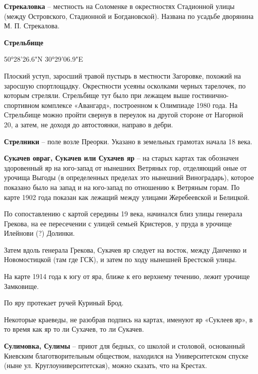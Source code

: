 \textbf{Стрекаловка} – местность на Соломенке в окрестностях Стадионной улицы (между Островского, Стадионной и Богдановской). Названа по усадьбе дворянина М. П. Стрекалова.\\

\medskip

\textbf{Стрельбище}

50°28'26.6"N 30°29'06.9"E

Плоский уступ, заросший травой пустырь в местности Загоровке, похожий на заросшую спортлощадку. Окрестности усеяны осколками черных тарелочек, по которым стреляли. Стрельбище тут было при лежащем выше  гости\-нично-спортивном комплексе «Авангард», построенном к Олимпиаде 1980 года. На Стрельбище можно пройти свернув в переулок на другой стороне от Нагорной 20, а затем, не доходя до автостоянки, направо в дебри.\\

\medskip

\textbf{Стрелники} – поле возле Преорки. Указано в земельных грамотах начала 18 века.\\

\medskip

\textbf{Сукачев овраг, Сукачев или Сухачев яр} – на старых картах так обозначен здоровенный яр на юго-запад от нынешних Ветряных гор, отделяющий оные от урочища Выгоды (в определенных пределах это нынешний Виноградарь), которое показано было на запад и на юго-запад по отношению к Ветряным горам. По карте 1902 года показан как лежащий между улицами Жеребеевской и Белицкой.

По сопоставлению с картой середины 19 века, начинался близ улицы генерала Грекова, на ее пересечении с улицей семьей Кристеров, у пруда в урочище Илейнови (?) Долинки.

Затем вдоль генерала Грекова, Сукачев яр следует на восток, между Данченко и Новомостицкой (там где ГСК), и затем по ходу нынешней Брестской улицы.

На карте 1914 года к югу от яра, ближе к его верхнему течению, лежит урочище Замковище.

По яру протекает ручей Куриный Брод.

Некоторые краеведы, не разобрав подпись на картах, именуют яр «Суклеев яр», в то время как яр то ли Сухачев, то ли Сукачев.\\

\medskip

\textbf{Сулимовка, Сулимы} – приют для бедных, со школой и столовой, основанный Киевским благотворительным обществом, находился на Университетском спуске (ныне ул. Круглоуниверситетская), можно сказать, что на Крестах.\\

